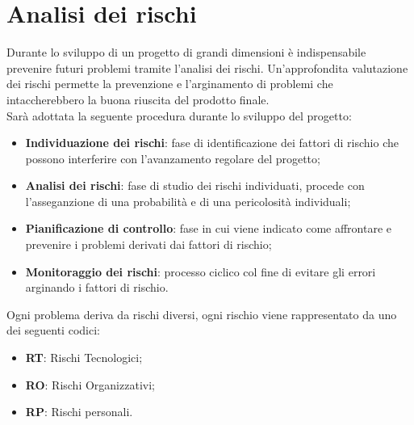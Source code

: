\section{Analisi dei rischi}

Durante lo sviluppo di un progetto di grandi dimensioni è indispensabile prevenire 
futuri problemi tramite l'analisi dei rischi.
Un'approfondita valutazione dei rischi permette la prevenzione e l'arginamento di 
problemi che intaccherebbero la buona riuscita del prodotto finale.\\
Sarà adottata la seguente procedura durante lo sviluppo del progetto:

\begin{itemize}
	\item \textbf{Individuazione dei rischi}: fase di identificazione dei fattori di rischio
	che possono interferire con l'avanzamento regolare del progetto;
	\item \textbf{Analisi dei rischi}: fase di studio dei rischi individuati,
	procede con l'asseganzione di una probabilità e di una pericolosità individuali;
	\item \textbf{Pianificazione di controllo}: fase in cui viene indicato come affrontare e prevenire
	i problemi derivati dai fattori di rischio;
	\item \textbf{Monitoraggio dei rischi}: processo ciclico col fine di evitare gli errori arginando i 
	fattori di rischio.
\end{itemize}
Ogni problema deriva da rischi diversi, ogni rischio viene rappresentato da uno dei seguenti codici:

\begin{itemize}
	\item \textbf{RT}: Rischi Tecnologici;
	\item \textbf{RO}: Rischi Organizzativi;
	\item \textbf{RP}: Rischi personali.
\end{itemize}

